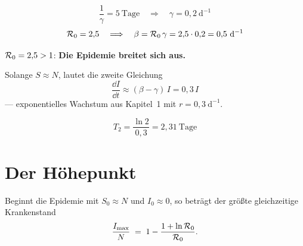 \begin{merksatz}
\[ \frac{1}{\gamma} = 5\ \text{Tage} \quad\Longrightarrow\quad \gamma = 0{,}2\ \mathrm{d}^{-1} \]
\[ \Rnull = 2{,}5 \quad\Longrightarrow\quad \beta = \Rnull\,\gamma = 2{,}5 \cdot 0{,}2 = 0{,}5\ \mathrm{d}^{-1} \]

$\mathcal{R}_0 = 2{,}5 > 1$: \textbf{Die Epidemie breitet sich aus.}

Solange $S \approx N$, lautet die zweite Gleichung
\[ \frac{\dd I}{\dd t} \approx (\beta - \gamma)\,I = 0{,}3\,I \]
--- exponentielles Wachstum aus Kapitel~1 mit $r = 0{,}3\ \mathrm{d}^{-1}$.

\[ T_2 = \frac{\ln 2}{0{,}3} = 2{,}31\ \text{Tage} \]

\begin{center}
\begin{minipage}{0.88\textwidth}
\end{minipage}
\end{center}
\end{merksatz}

\section{Der Höhepunkt}

\begin{merksatz}
Beginnt die Epidemie mit $S_0 \approx N$ und $I_0 \approx 0$, so beträgt der größte gleichzeitige Krankenstand
\[ \frac{I_{\max}}{N} \;=\; 1 - \frac{1+\ln\mathcal{R}_0}{\mathcal{R}_0} . \]
\end{merksatz}

